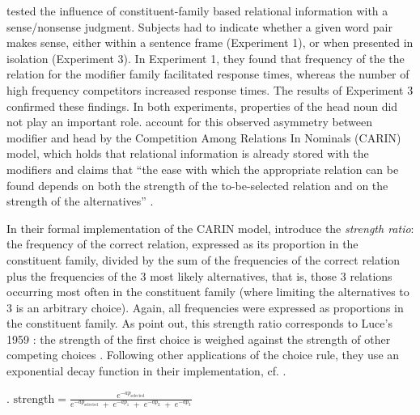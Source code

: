 \citet{GagneandShoben:1997} tested the influence of constituent-family based
relational information with a sense/nonsense judgment. 
Subjects had to indicate whether a given word pair makes sense, either
within a sentence frame (Experiment 1), or when presented in isolation
(Experiment 3). %
In Experiment 1, they found that frequency of the the relation for the
modifier family facilitated response times, whereas the number of
high frequency competitors increased response times. The results of Experiment 3
confirmed these findings. In both experiments, properties of the head
noun did not play an important role.
\citet{GagneandShoben:1997} account for this observed asymmetry
between modifier and head by the
Competition Among Relations In Nominals (CARIN) model, which holds
that relational information is already stored with the modifiers and claims
that ``the ease with which the appropriate relation can be found
depends on both the strength of the to-be-selected relation and on the
strength of the alternatives'' \citep[81]{GagneandShoben:1997}. 

In their formal implementation of the CARIN model, \citeauthor{GagneandShoben:1997} introduce the
\emph{strength ratio}: the frequency of the
correct relation, expressed as its proportion in the constituent
family, divided by the sum of the frequencies of the
correct relation plus the frequencies of the 3 most likely
alternatives, that is, those 3 relations occurring most often in the
constituent family (where limiting the alternatives to 3 is an
arbitrary choice). Again, all frequencies were expressed as
proportions in the constituent family. As \citet[81]{GagneandShoben:1997} point out, this strength ratio corresponds
to Luce's 1959 : the strength of the first choice is weighed
  against the strength of other competing choices \citep{Luce:1959}.
Following other applications of the choice rule, they use an exponential decay function
in their implementation, cf. \Next.

\ex. \label{ex:strength-ratio}
\( \displaystyle \text{strength} = 
\frac{e^{-ap_{\text{selected}}}}{e^{-ap_{\text{selected}}}\; + \;
e^{-ap_{1}} \; + \; e^{-ap_{2}}\; +\; e^{-ap_{3}}} \)

